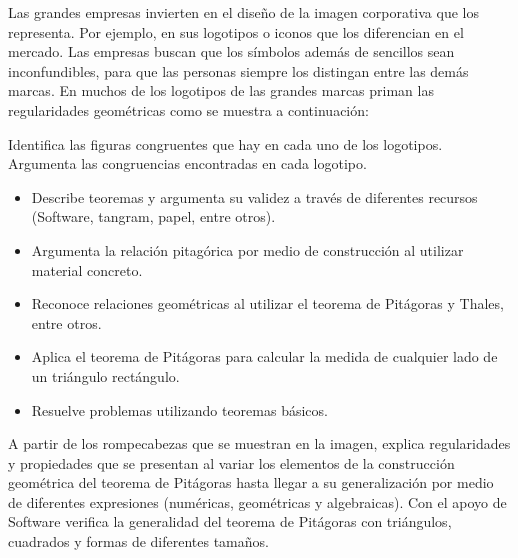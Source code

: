 Las grandes empresas invierten en el diseño de la imagen corporativa que los representa. Por ejemplo, en sus logotipos o iconos que los diferencian en el mercado. Las empresas buscan que los símbolos además de sencillos sean inconfundibles, para que las personas siempre los distingan entre las demás marcas. En muchos de los logotipos de las grandes marcas priman las regularidades geométricas como se muestra a continuación:




Identifica las figuras congruentes que hay en cada uno de los logotipos. Argumenta las congruencias encontradas en cada logotipo.



\evidencias

\begin{itemize}
  \item Describe teoremas y argumenta su validez a través de diferentes recursos (Software, tangram, papel, entre otros).
  \item Argumenta la relación pitagórica por medio de construcción al utilizar material concreto.
  \item Reconoce relaciones geométricas al utilizar el teorema de Pitágoras y Thales, entre otros.
  \item Aplica el teorema de Pitágoras para calcular la medida de cualquier lado de un triángulo rectángulo.
  \item Resuelve problemas utilizando teoremas básicos.
\end{itemize}

\ejemplo

A partir de los rompecabezas que se muestran en la imagen, explica regularidades y propiedades que se presentan al variar los elementos de la construcción geométrica del teorema de Pitágoras hasta llegar a su generalización por medio de diferentes expresiones (numéricas, geométricas y algebraicas). Con el apoyo de Software verifica la generalidad del teorema de Pitágoras con triángulos, cuadrados y formas de diferentes tamaños.


